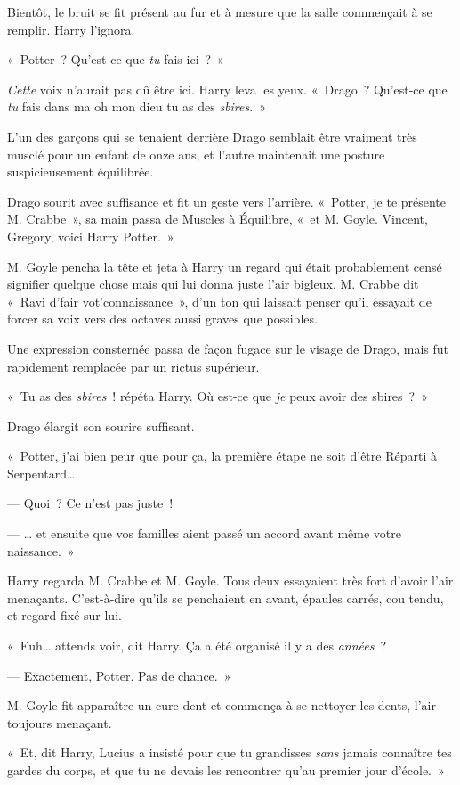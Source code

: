 Bientôt, le bruit se fit présent au fur et à mesure que la salle commençait à se remplir. Harry l'ignora.

«~Potter~? Qu'est-ce que \emph{tu} fais ici~?~»

\emph{Cette} voix n'aurait pas dû être ici.
Harry leva les yeux. «~Drago~? Qu'est-ce que \emph{tu} fais dans ma oh mon dieu tu as des \emph{sbires}.~»

L'un des garçons qui se tenaient derrière Drago semblait être vraiment très musclé pour un enfant de onze ans, et l'autre maintenait une posture suspicieusement équilibrée.

Drago sourit avec suffisance et fit un geste vers l'arrière.
«~Potter, je te présente M. Crabbe~», sa main passa de Muscles à Équilibre, «~et M. Goyle.
Vincent, Gregory, voici Harry Potter.~»

M. Goyle pencha la tête et jeta à Harry un regard qui était probablement censé signifier quelque chose mais qui lui donna juste l'air bigleux.
M. Crabbe dit «~Ravi d'fair vot'connaissance~», d'un ton qui laissait penser qu'il essayait de forcer sa voix vers des octaves aussi graves que possibles.

Une expression consternée passa de façon fugace sur le visage de Drago, mais fut rapidement remplacée par un rictus supérieur.

«~Tu as des \emph{sbires}~! répéta Harry. Où est-ce que \emph{je} peux avoir des sbires~?~»

Drago élargit son sourire suffisant.

«~Potter, j'ai bien peur que pour ça, la première étape ne soit d'être Réparti à Serpentard…

--- Quoi~? Ce n'est pas juste~!

--- … et ensuite que vos familles aient passé un accord avant même votre naissance.~»

Harry regarda M. Crabbe et M. Goyle.
Tous deux essayaient très fort d'avoir l'air menaçants.
C'est-à-dire qu'ils se penchaient en avant, épaules carrés, cou tendu, et regard fixé sur lui.

«~Euh… attends voir, dit Harry. Ça a été organisé il y a des \emph{années}~?

--- Exactement, Potter. Pas de chance.~»

M. Goyle fit apparaître un cure-dent et commença à se nettoyer les dents, l'air toujours menaçant.

«~Et, dit Harry, Lucius a insisté pour que tu grandisses \emph{sans} jamais connaître tes gardes du corps, et que tu ne devais les rencontrer qu'au premier jour d'école.~»

